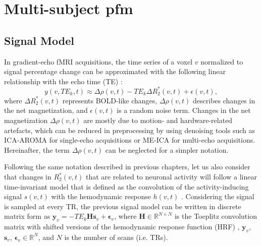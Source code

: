 \section{Multi-subject \acrlong*{pfm}}

\subsection{Signal Model}

In gradient-echo fMRI acquisitions, the time series of a voxel $v$ normalized to
signal percentage change can be approximated with the following linear
relationship with the echo time (TE) \citep{Kundu2017MultiechofMRI}: 
\begin{equation}
    y(v,TE_k, t) \approx \Delta \rho(v,t) - TE_k \Delta
    R_2^*(v,t) + \epsilon(v,t),
\end{equation}
where $\Delta R_2^*(v,t)$ represents BOLD-like changes, $\Delta \rho(v,t)$
describes changes in the net magnetization, and $\epsilon(v,t)$ is a random
noise term. Changes in the net magnetization $\Delta \rho(v,t)$ are mostly due
to motion- and hardware-related artefacts, which can be reduced in preprocessing
by using denoising tools such as ICA-AROMA \citep{Pruim2015ICAAROMArobust} for
single-echo acquisitions or ME-ICA \citep{Kundu2012DifferentiatingBOLDnon,
Kundu2017MultiechofMRI} for multi-echo acquisitions. Hereinafter, the term
$\Delta \rho(v,t)$ can be neglected for a simpler notation. 

Following the same notation described in previous chapters, let us also consider
that changes in $R_2^*(v,t)$ that are related to neuronal activity will follow a
linear time-invariant model that is defined as the convolution of the
activity-inducing signal $s(v,t)$ with the hemodynamic response $h(v,t)$
\citep{Boynton1996LinearSystemsAnalysis,
Glover1999DeconvolutionImpulseResponse}. Considering the signal is sampled at
every TR, the previous signal model can be written in discrete matrix form as
$\mathbf{y}_{v} = -TE_ k \mathbf{H} \mathbf{s}_{v} + \boldsymbol{\epsilon}_{v}$,
where $\mathbf{H} \in \mathbb{R}^{N \times N}$ is the Toeplitz convolution
matrix with shifted versions of the hemodynamic response function (HRF)
\citep{Gitelman2003Modelingregionalpsychophysiologic,
Gaudes2013Paradigmfreemapping}, $\mathbf{y}_v$, $\mathbf{s}_v$,
$\boldsymbol{\epsilon}_{v} \in \mathbb{R}^{N}$, and $N$ is the number of scans
(i.e. TRs). 

